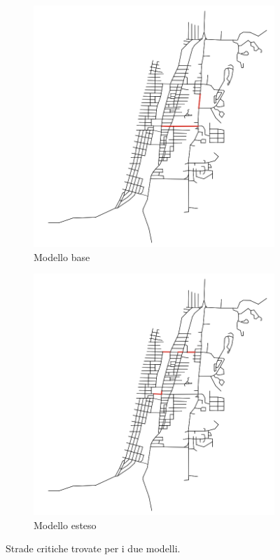 \begin{figure}[ht]
    \centering
    \begin{subfigure}{0.475\textwidth}
        \centering
        \includegraphics[width=\textwidth]{images/analisi/comparison-base-critical-links.png}
        \caption{Modello base}
    \end{subfigure}
    \hfill
    \begin{subfigure}{0.475\textwidth}
        \centering
        \includegraphics[width=\textwidth]{images/analisi/comparison-new-critical-links.png}
        \caption{Modello esteso}
    \end{subfigure}
    \caption{Strade critiche trovate per i due modelli.}
    \label{fig:analisi-comparison-critical-links2}
\end{figure}

